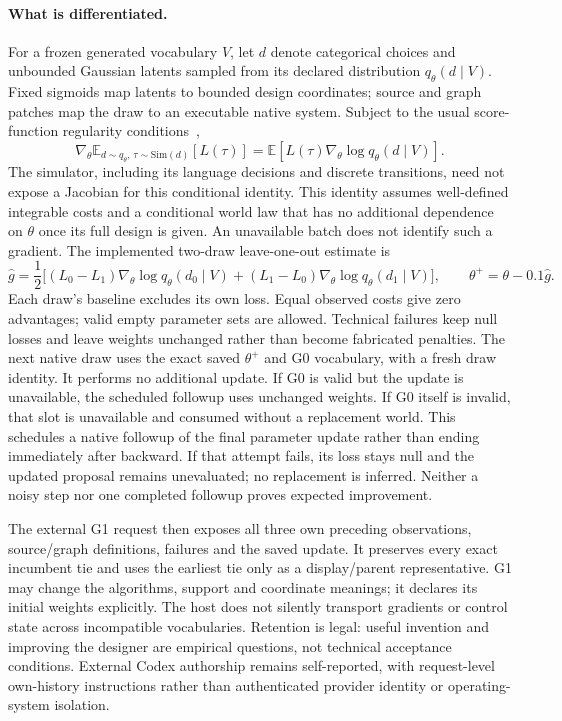 \paragraph{What is differentiated.}
For a frozen generated vocabulary $V$, let $d$ denote categorical choices and
unbounded Gaussian latents sampled from its declared distribution
$q_\theta(d\mid V)$. Fixed sigmoids map latents to bounded design coordinates;
source and graph patches map the draw to an executable native system. Subject to
the usual score-function regularity conditions~\citep{parmas2021unified},
\begin{equation}
 \nabla_\theta\mathbb{E}_{d\sim q_\theta,\,\tau\sim\mathrm{Sim}(d)}[L(\tau)]
 =\mathbb{E}[L(\tau)\nabla_\theta\log q_\theta(d\mid V)].
\end{equation}
The simulator, including its language decisions and discrete transitions,
need not expose a Jacobian for this conditional identity. This identity
assumes well-defined integrable costs and a conditional world law
that has no additional dependence on $\theta$ once its full design is given.
An unavailable batch does not identify such a gradient. The implemented
two-draw leave-one-out estimate is
\begin{equation}
 \widehat g=\frac12\bigl[(L_0-L_1)\nabla_\theta\log q_\theta(d_0\mid V)
 +(L_1-L_0)\nabla_\theta\log q_\theta(d_1\mid V)\bigr],
 \qquad \theta^+=\theta-0.1\widehat g.
\end{equation}
Each draw's baseline excludes its own loss. Equal observed costs give zero
advantages; valid empty parameter sets are allowed. Technical failures keep
null losses and leave weights unchanged rather than become fabricated
penalties. The next native draw uses the exact saved $\theta^+$ and G0
vocabulary, with a fresh draw identity. It performs no additional update.
If G0 is valid but the update is unavailable, the scheduled followup uses
unchanged weights. If G0 itself is invalid, that slot is unavailable and
consumed without a replacement world.
This schedules a native followup of the final parameter update rather than
ending immediately after backward. If that attempt fails, its loss stays null
and the updated proposal remains unevaluated; no replacement is inferred.
Neither a noisy step nor one completed followup proves expected improvement.

The external G1 request then exposes all three own preceding observations,
source/graph definitions, failures and the saved update. It preserves every
exact incumbent tie and uses the earliest tie only as a display/parent
representative. G1 may change the algorithms, support and coordinate meanings;
it declares its initial weights explicitly. The host does not silently
transport gradients or control state across incompatible vocabularies.
Retention is legal: useful invention and improving the designer are empirical
questions, not technical acceptance conditions. External Codex authorship
remains self-reported, with request-level own-history instructions rather than
authenticated provider identity or operating-system isolation.

